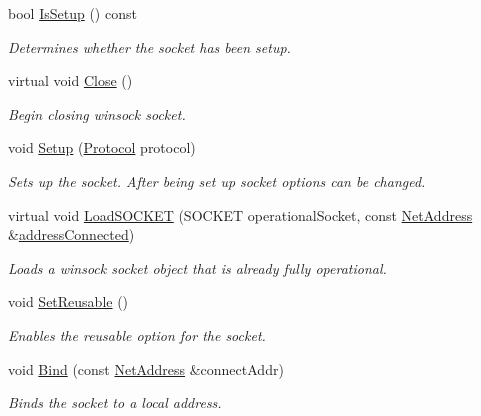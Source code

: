 \begin{DoxyCompactItemize}
bool \hyperlink{class_net_socket_simple_ae2ffd26bbc701cbfa0262e59d8ce1e66}{IsSetup} () const 
\begin{DoxyCompactList}\small\item\em Determines whether the socket has been setup. \item\end{DoxyCompactList}\item 
virtual void \hyperlink{class_net_socket_simple_a2ec9f15bf28b6ae73783d03c6aedffec}{Close} ()
\begin{DoxyCompactList}\small\item\em Begin closing winsock socket. \item\end{DoxyCompactList}\item 
void \hyperlink{class_net_socket_simple_a1a8992a2f6b1dfbd4a328aff5a898c5c}{Setup} (\hyperlink{class_net_socket_simple_a31450636f6fb9ece239c50f616e0d7b0}{Protocol} protocol)
\begin{DoxyCompactList}\small\item\em Sets up the socket. After being set up socket options can be changed. \item\end{DoxyCompactList}\item 
virtual void \hyperlink{class_net_socket_simple_a891ba8e42ebdea12ee56888e5adf942d}{LoadSOCKET} (SOCKET operationalSocket, const \hyperlink{class_net_address}{NetAddress} \&\hyperlink{class_net_socket_simple_a76881498ffe79f92e87515260fe4d44a}{addressConnected})
\begin{DoxyCompactList}\small\item\em Loads a winsock socket object that is already fully operational. \item\end{DoxyCompactList}\item 
void \hyperlink{class_net_socket_simple_ae6712327a658f118d91fa7057ef40b92}{SetReusable} ()
\begin{DoxyCompactList}\small\item\em Enables the reusable option for the socket. \item\end{DoxyCompactList}\item 
void \hyperlink{class_net_socket_simple_a6d1da3b40e5df6b90571cf1592ca4fa2}{Bind} (const \hyperlink{class_net_address}{NetAddress} \&connectAddr)
\begin{DoxyCompactList}\small\item\em Binds the socket to a local address. \item\end{DoxyCompactList}\item 

\end{DoxyCompactItemize}
